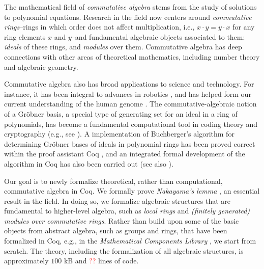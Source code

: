 \documentclass{article}
\begin{document}
The mathematical field of \emph{commutative algebra} stems from the study of solutions to polynomial equations.  Research in the field now centers around \emph{commutative rings}--rings in which order does not affect multiplication, i.e., $x \cdot y = y \cdot x$ for any ring elements $x$ and $y$--and fundamental algebraic objects associated to them:  \emph{ideals} of these rings, and \emph{modules} over them. 
Commutative algebra has deep connections with other areas of theoretical mathematics, including number theory and algebraic geometry. 

Commutative algebra also has broad applications to science and technology.  For instance, it has been integral to advances in robotics \cite{cox-little-oshea}, and has helped form our current understanding of the human genome \cite{genetic-algebra}. 
The commutative-algebraic notion of a Gr\"obner basis, a special type of generating set for an ideal in a ring of polynomials, has become a fundamental computational tool in 
coding theory and cryptography (e.g., see  \cite{grobner-bases-cryptography}).
A implementation of Buchberger's algorithm \cite{buchberger} for determining 
Gr\"obner bases of ideals in polynomial rings has been proved correct within the proof assistant Coq \cite{the_coq_development_team_2019_3476303,thery-buchberger}, and an integrated formal development of the algorithm in Coq has also been carried out \cite{persson2001integrated} (see also \cite{grobner-type-theory}). 

Our goal is to newly formalize theoretical, rather than computational, commutative algebra in Coq. 
We formally prove \emph{Nakayama's lemma} \cite{nakayama-1951, azumaya}, an essential result in the field. 
In doing so, we formalize algebraic structures that are fundamental to higher-level algebra, such as 
\emph{local rings} and \emph{(finitely generated) modules over commutative rings}. 
Rather than build upon some of the basic objects from abstract algebra, such as groups and rings, that have been formalized in Coq, e.g., in the  
\emph{Mathematical Components Library} 
\cite{mathcomp}, we start from scratch. 
 The theory, including the formalization of all algebraic structures, is approximately  $100$ kB and \textcolor{red}{??} lines of code.
 
\end{document}
